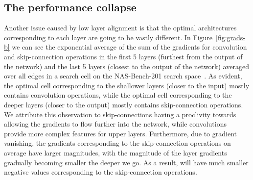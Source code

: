 \documentclass{article} \usepackage{fancyhdr, iclr2023_conference, times}
\newcommand{\lambdafn}{layer alignment\xspace}
\begin{document}
\subsection{The performance collapse}
\par Another issue caused by low \lambdafn is that the optimal architectures corresponding to each layer are going to be vastly different. In Figure~\ref{fig:grads-b} we can see the exponential average of the sum of the gradients for convolution and skip-connection operations in the first 5 layers (furthest from the output of the network) and the last 5 layers (closest to the output of the network) averaged over all edges in a search cell on the NAS-Bench-201 search space~\citep{DBLP:conf/iclr/Dong020}. As evident, the optimal cell corresponding to the shallower layers (closer to the input) mostly contains convolution operations, while the optimal cell corresponding to the deeper layers (closer to the output) mostly contains skip-connection operations. We attribute this observation to skip-connections having a proclivity towards allowing the gradients to flow further into the network, while convolutions provide more complex features for upper layers. Furthermore, due to gradient vanishing, the gradients corresponding to the skip-connection operations on average have larger magnitudes, with the magnitude of the layer gradients gradually becoming smaller the deeper we go. As a result,  will have much smaller negative values corresponding to the skip-connection operations.
\end{document}
